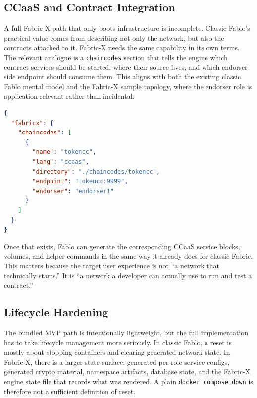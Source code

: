 \subsection{CCaaS and Contract Integration}

A full Fabric-X path that only boots infrastructure is incomplete. Classic Fablo's practical value comes from describing not only the network, but also the contracts attached to it. Fabric-X needs the same capability in its own terms. The relevant analogue is a \texttt{chaincodes} section that tells the engine which contract services should be started, where their source lives, and which endorser-side endpoint should consume them. This aligns with both the existing classic Fablo mental model and the Fabric-X sample topology, where the endorser role is application-relevant rather than incidental.

\begin{tcolorbox}[colback=gray!5!white, colframe=gray!50!black,
  title=Planned Fabric-X contract config,
  fonttitle=\bfseries, arc=4pt]
\begin{lstlisting}[language=json, basicstyle=\ttfamily\footnotesize]
{
  "fabricx": {
    "chaincodes": [
      {
        "name": "tokencc",
        "lang": "ccaas",
        "directory": "./chaincodes/tokencc",
        "endpoint": "tokencc:9999",
        "endorser": "endorser1"
      }
    ]
  }
}
\end{lstlisting}
\end{tcolorbox}

Once that exists, Fablo can generate the corresponding CCaaS service blocks, volumes, and helper commands in the same way it already does for classic Fabric. This matters because the target user experience is not ``a network that technically starts.'' It is ``a network a developer can actually use to run and test a contract.''

\subsection{Lifecycle Hardening}

The bundled MVP path is intentionally lightweight, but the full implementation has to take lifecycle management more seriously. In classic Fablo, a reset is mostly about stopping containers and clearing generated network state. In Fabric-X, there is a larger state surface: generated per-role service configs, generated crypto material, namespace artifacts, database state, and the Fabric-X engine state file that records what was rendered. A plain \texttt{docker compose down} is therefore not a sufficient definition of reset.


